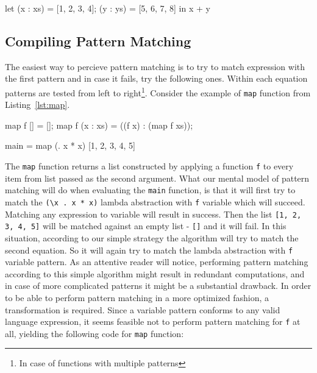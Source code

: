 \documentclass[12pt,a4paper]{report}
\begin{document}
\vspace*{0.2in}
\begin{code}[style=haskell,label=lst:letrec_pattern_matching,caption={Pattern matching
  in let(rec) expressions.}]
let
    (x : xs) = [1, 2, 3, 4];
    (y : ys) = [5, 6, 7, 8]
in
    x + y
\end{code}

\subsection{Compiling Pattern Matching}
The easiest way to percieve pattern matching is to try to match expression with
the first pattern and in case it fails, try the following ones. Within each
equation patterns are tested from left to right\footnote{In case of functions
with multiple patterns}. Consider the example of \texttt{map} function from
Listing~\ref{lst:map}.

\vspace*{0.2in}
\begin{code}[style=haskell,label=lst:map,caption={Map function example.}]
map f [] = [];
map f (x : xs) = ((f x) : (map f xs));

main = map (\x . x * x) [1, 2, 3, 4, 5]
\end{code}

The \texttt{map} function returns a list constructed by applying a function
\texttt{f} to every item from list passed as the second argument. What our
mental model of pattern matching will do when evaluating the \texttt{main}
function, is that it will first try to match the \texttt{(\textbackslash x . x
* x)} lambda abstraction with \texttt{f} variable which will succeed. Matching
any expression to variable will result in success. Then the list \texttt{[1, 2,
3, 4, 5]} will be matched against an empty list - \texttt{[]} and it will fail.
In this situation, according to our simple strategy the algorithm will try to
match the second equation. So it will again try to match the lambda abstraction
with \texttt{f} variable pattern. As an attentive reader will notice,
performing pattern matching according to this simple algorithm might result in
redundant computations, and in case of more complicated patterns it might be a
substantial drawback. In order to be able to perform pattern matching in a more
optimized fashion, a transformation is required. Since a variable pattern
conforms to any valid language expression, it seems feasible not to perform
pattern matching for \texttt{f} at all, yielding the following code for
\texttt{map} function:
\end{document}
